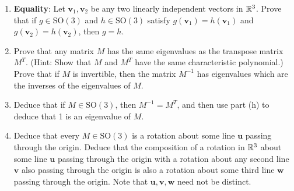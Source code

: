 \documentclass[../psets.tex]{subfiles}
\begin{document}
\begin{enumerate}
\begin{enumerate}
        \item \textbf{Equality}: Let $\mathbf{v}_1,\mathbf{v}_2$ be any two linearly independent vectors in $\mathbb{R}^3$. Prove that if $g\in\text{SO}(3)$ and $h\in\text{SO}(3)$ satisfy $g(\mathbf{v}_1)=h(\mathbf{v}_1)$ and $g(\mathbf{v}_2)=h(\mathbf{v}_2)$, then $g=h$.
        \item Prove that any matrix $M$ has the same eigenvalues as the transpose matrix $M^T$. (Hint: Show that $M$ and $M^T$ have the same characteristic polynomial.) Prove that if $M$ is invertible, then the matrix $M^{-1}$ has eigenvalues which are the inverses of the eigenvalues of $M$.
        \item Deduce that if $M\in\text{SO}(3)$, then $M^{-1}=M^T$, and then use part (h) to deduce that 1 is an eigenvalue of $M$.
        \item Deduce that every $M\in\text{SO}(3)$ is a rotation about some line $\mathbf{u}$ passing through the origin. Deduce that the composition of a rotation in $\mathbb{R}^3$ about some line $\mathbf{u}$ passing through the origin with a rotation about any second line $\mathbf{v}$ also passing through the origin is also a rotation about some third line $\mathbf{w}$ passing through the origin. Note that $\mathbf{u},\mathbf{v},\mathbf{w}$ need not be distinct.
    \end{enumerate}
\end{enumerate}
\end{document}
